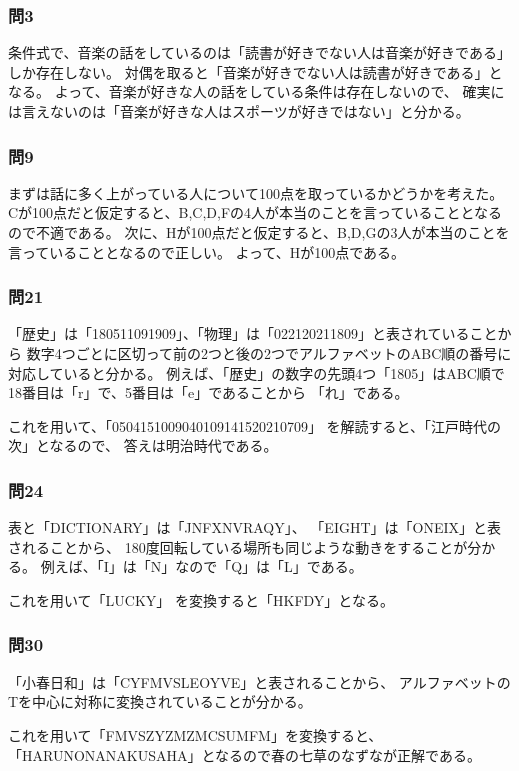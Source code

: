\documentclass[12pt]{jarticle}
\begin{document}
\subsubsection{問3}
条件式で、音楽の話をしているのは「読書が好きでない人は音楽が好きである」しか存在しない。
対偶を取ると「音楽が好きでない人は読書が好きである」となる。
よって、音楽が好きな人の話をしている条件は存在しないので、
確実には言えないのは「音楽が好きな人はスポーツが好きではない」と分かる。

\subsubsection{問9}
まずは話に多く上がっている人について100点を取っているかどうかを考えた。
Cが100点だと仮定すると、B,C,D,Fの4人が本当のことを言っていることとなるので不適である。
次に、Hが100点だと仮定すると、B,D,Gの3人が本当のことを言っていることとなるので正しい。
よって、Hが100点である。

\clearpage
\subsubsection{問21}
「歴史」は「180511091909」、「物理」は「022120211809」と表されていることから
数字4つごとに区切って前の2つと後の2つでアルファベットのABC順の番号に対応していると分かる。
例えば、「歴史」の数字の先頭4つ「1805」はABC順で18番目は「r」で、5番目は「e」であることから
「れ」である。

これを用いて、「0504151009040109141520210709」
を解読すると、「江戸時代の次」となるので、
答えは明治時代である。

\subsubsection{問24}
表と「DICTIONARY」は「JNFXNVRAQY」、
「EIGHT」は「ONEIX」と表されることから、
180度回転している場所も同じような動きをすることが分かる。
例えば、「I」は「N」なので「Q」は「L」である。

これを用いて「LUCKY」
を変換すると「HKFDY」となる。

\subsubsection{問30}
「小春日和」は「CYFMVSLEOYVE」と表されることから、
アルファベットのTを中心に対称に変換されていることが分かる。

これを用いて「FMVSZYZMZMCSUMFM」を変換すると、
「HARUNONANAKUSAHA」となるので春の七草のなずなが正解である。
\end{document}
